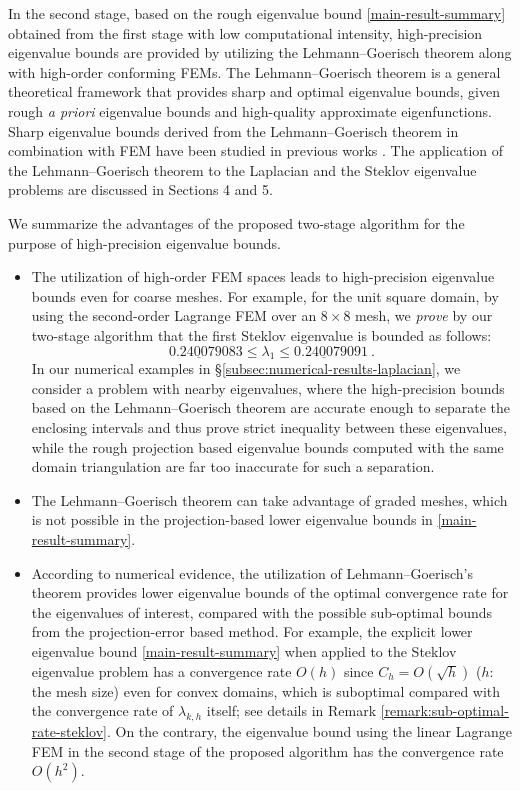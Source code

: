 \documentclass[a4,11pt]{article}
\numberwithin{equation}{section}
\begin{document}
\medskip

In the second stage, based on the rough eigenvalue bound \cref{main-result-summary} obtained from the first stage with  low computational intensity, high-precision eigenvalue bounds are provided by utilizing the Lehmann--Goerisch theorem along with high-order conforming FEMs. The Lehmann--Goerisch theorem is a general theoretical framework that provides sharp and optimal eigenvalue bounds, given rough {\it a priori} eigenvalue bounds and high-quality approximate eigenfunctions. Sharp eigenvalue bounds derived from the Lehmann–Goerisch theorem in combination with FEM have been studied in previous works \cite{liu-2013-2,liu2014high,tomas2018}. The application of   the Lehmann--Goerisch theorem to the Laplacian and the Steklov eigenvalue problems are discussed in Sections 4 and 5.

\medskip

We summarize the advantages of the proposed two-stage algorithm for the purpose of high-precision eigenvalue bounds.
\begin{itemize}
    \item [(a)] The utilization of high-order FEM spaces leads to high-precision eigenvalue bounds even for coarse meshes. 
    For example, for the unit square domain, by using the second-order Lagrange FEM over an $8\times 8$ mesh, we {\em prove} by our two-stage algorithm that the first Steklov eigenvalue is bounded as follows:
$$
\underline{0.2400790}83 \le \lambda_1 \le \underline{0.2400790}91  \:.
$$
In our numerical examples in \S \ref{subsec:numerical-results-laplacian}, we consider a problem with nearby eigenvalues, where the high-precision bounds based on the Lehmann--Goerisch theorem are accurate enough to separate the enclosing intervals and thus prove strict inequality between these eigenvalues, while the rough projection based eigenvalue bounds computed with the same domain triangulation are far too inaccurate for such a separation.
	\item [(b)] The Lehmann--Goerisch theorem can take advantage of graded meshes, which is not possible in the projection-based lower eigenvalue bounds in \eqref{main-result-summary}. 
	\item [(c)] According to numerical evidence, the utilization of Lehmann--Goerisch's theorem  provides lower eigenvalue bounds of the optimal convergence rate for the eigenvalues of interest, compared with the possible sub-optimal bounds from the projection-error based method. For example, the explicit lower eigenvalue bound \cref{main-result-summary} when applied to the Steklov eigenvalue problem has a convergence rate  $O(h)$ since $C_h=O(\sqrt{h})$ ($h$: the mesh size) even for convex domains, which is suboptimal compared with the convergence rate of $\lambda_{k,h}$ itself; see details in Remark \ref{remark:sub-optimal-rate-steklov}. 
	 On the contrary, the eigenvalue bound using the linear Lagrange FEM in the second stage of the proposed algorithm has the convergence rate  $O(h^2)$. 

\end{itemize}
\end{document}
